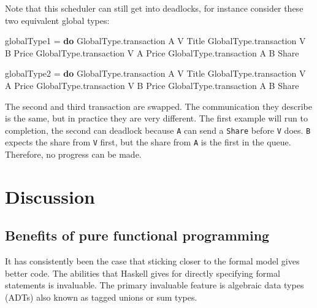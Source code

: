 \documentclass[runningheads,plain]{llncs}
\newenvironment{Shaded}{}{}
\newcommand{\KeywordTok}[1]{\textcolor[rgb]{0.00,0.44,0.13}{\textbf{#1}}}
\newcommand{\DataTypeTok}[1]{\textcolor[rgb]{0.56,0.13,0.00}{#1}}
\newcommand{\FunctionTok}[1]{\textcolor[rgb]{0.02,0.16,0.49}{#1}}
\newcommand{\NormalTok}[1]{#1}
\begin{document}
Note that this scheduler can still get into deadlocks, for instance
consider these two equivalent global types:

\begin{Shaded}
\begin{Highlighting}[]
\NormalTok{globalType1 }\FunctionTok{=} \KeywordTok{do} 
\NormalTok{    GlobalType.transaction }\DataTypeTok{A} \DataTypeTok{V} \DataTypeTok{Title} 
\NormalTok{    GlobalType.transaction }\DataTypeTok{V} \DataTypeTok{B} \DataTypeTok{Price} 
\NormalTok{    GlobalType.transaction }\DataTypeTok{V} \DataTypeTok{A} \DataTypeTok{Price} 
\NormalTok{    GlobalType.transaction }\DataTypeTok{A} \DataTypeTok{B} \DataTypeTok{Share} 

\NormalTok{globalType2 }\FunctionTok{=} \KeywordTok{do} 
\NormalTok{    GlobalType.transaction }\DataTypeTok{A} \DataTypeTok{V} \DataTypeTok{Title} 
\NormalTok{    GlobalType.transaction }\DataTypeTok{V} \DataTypeTok{A} \DataTypeTok{Price} 
\NormalTok{    GlobalType.transaction }\DataTypeTok{V} \DataTypeTok{B} \DataTypeTok{Price} 
\NormalTok{    GlobalType.transaction }\DataTypeTok{A} \DataTypeTok{B} \DataTypeTok{Share} 
\end{Highlighting}
\end{Shaded}

The second and third transaction are swapped. The communication they describe
is the same, but in practice they are very different. The first example will
run to completion, the second can deadlock because \texttt{A} can
send a \texttt{Share} before \texttt{V} does. \texttt{B} expects the
share from \texttt{V} first, but the share from \texttt{A} is the first
in the queue. Therefore, no progress can be made.


\section{Discussion}\label{discussion}

\subsection{Benefits of pure functional
programming}\label{benefits-of-pure-functional-programming}

It has consistently been the case that sticking closer to the formal
model gives better code. The abilities that Haskell gives for directly
specifying formal statements is invaluable. The primary invaluable
feature is algebraic data types (ADTs) also known as tagged unions or
sum types.
\end{document}
